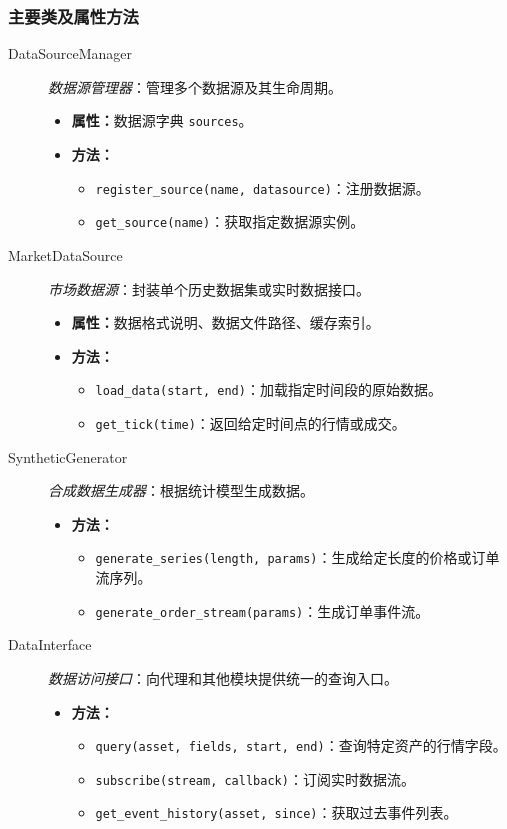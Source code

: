 \subsubsection{主要类及属性方法}
\begin{description}
  \item[DataSourceManager] \emph{数据源管理器}：管理多个数据源及其生命周期。
  \begin{itemize}
    \item \textbf{属性：}数据源字典 \verb|sources|。
    \item \textbf{方法：}
      \begin{itemize}
        \item \verb|register_source(name, datasource)|：注册数据源。
        \item \verb|get_source(name)|：获取指定数据源实例。
      \end{itemize}
  \end{itemize}
  \item[MarketDataSource] \emph{市场数据源}：封装单个历史数据集或实时数据接口。
  \begin{itemize}
    \item \textbf{属性：}数据格式说明、数据文件路径、缓存索引。
    \item \textbf{方法：}
      \begin{itemize}
        \item \verb|load_data(start, end)|：加载指定时间段的原始数据。
        \item \verb|get_tick(time)|：返回给定时间点的行情或成交。
      \end{itemize}
  \end{itemize}
  \item[SyntheticGenerator] \emph{合成数据生成器}：根据统计模型生成数据。
  \begin{itemize}
    \item \textbf{方法：}
      \begin{itemize}
        \item \verb|generate_series(length, params)|：生成给定长度的价格或订单流序列。
        \item \verb|generate_order_stream(params)|：生成订单事件流。
      \end{itemize}
  \end{itemize}
  \item[DataInterface] \emph{数据访问接口}：向代理和其他模块提供统一的查询入口。
  \begin{itemize}
    \item \textbf{方法：}
      \begin{itemize}
        \item \verb|query(asset, fields, start, end)|：查询特定资产的行情字段。
        \item \verb|subscribe(stream, callback)|：订阅实时数据流。
        \item \verb|get_event_history(asset, since)|：获取过去事件列表。
      \end{itemize}
  \end{itemize}
\end{description}

